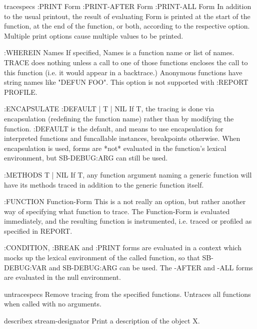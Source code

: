 \documentclass[10pt,english]{book}
\begin{document}
\begin{macro}{trace}{\rest specs}
   :PRINT Form
   :PRINT-AFTER Form
   :PRINT-ALL Form
       In addition to the usual printout, the result of evaluating Form is
       printed at the start of the function, at the end of the function, or
       both, according to the respective option. Multiple print options cause
       multiple values to be printed.

   :WHEREIN Names
       If specified, Names is a function name or list of names. TRACE does
       nothing unless a call to one of those functions encloses the call to
       this function (i.e. it would appear in a backtrace.)  Anonymous
       functions have string names like "DEFUN FOO". This option is not
       supported with :REPORT PROFILE.

   :ENCAPSULATE {:DEFAULT | T | NIL}
       If T, the tracing is done via encapsulation (redefining the function
       name) rather than by modifying the function. :DEFAULT is the default,
       and means to use encapsulation for interpreted functions and funcallable
       instances, breakpoints otherwise. When encapsulation is used, forms are
       *not* evaluated in the function's lexical environment, but SB-DEBUG:ARG
       can still be used.

   :METHODS {T | NIL}
       If T, any function argument naming a generic function will have its
       methods traced in addition to the generic function itself.

   :FUNCTION Function-Form
       This is a not really an option, but rather another way of specifying
       what function to trace. The Function-Form is evaluated immediately,
       and the resulting function is instrumented, i.e. traced or profiled
       as specified in REPORT.

:CONDITION, :BREAK and :PRINT forms are evaluated in a context which
mocks up the lexical environment of the called function, so that
SB-DEBUG:VAR and SB-DEBUG:ARG can be used. The -AFTER and -ALL forms
are evaluated in the null environment.
\end{macro}

\begin{macro}{untrace}{\rest specs}
  Remove tracing from the specified functions. Untraces all
functions when called with no arguments.
\end{macro}

\begin{function}{describe}{x \op stream-designator}
  Print a description of the object X.
\end{function}
\end{document}
